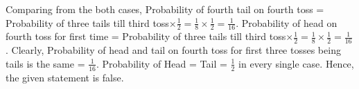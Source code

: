 \documentclass[journal,12pt,twocolumn]{IEEEtran}
\theoremstyle{remark}
\begin{document}
Comparing from the both cases, 
Probability of fourth tail on fourth toss  = Probability of three tails till third toss$\times  \frac{1}{2} = \frac{1}{8} \times \frac{1}{2} = \frac{1}{16} $.
Probability of head on fourth toss for first time = Probability of three tails till third toss$\times \frac{1}{2} = \frac{1}{8} \times \frac{1}{2} = \frac{1}{16} $.
Clearly, Probability of head and tail on fourth toss for first three tosses being tails is the same =  $\frac{1}{16}$.
 Probability of Head = Tail = $ \frac{1}{2} $ in every single case.
Hence, the given statement is false.
\end{document}
